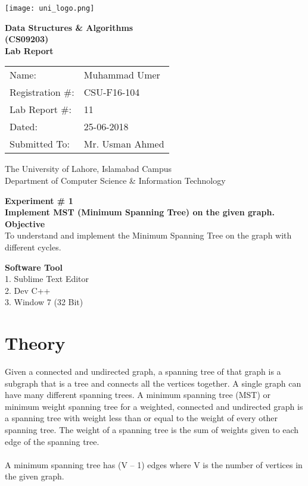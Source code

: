 \documentclass[11pt]{article}            %
\begin{document}
\begin{titlepage}
    \centering
  \vfill
    \texttt{[image: uni\_logo.png]} \\ 
	\vskip2cm
    {\bfseries\Large
	Data Structures  \& Algorithms \\ (CS09203)\\
	
	\vskip2cm
	Lab Report 
	 
	\vskip2cm
	}    

\begin{center}
\begin{tabular}{ l l  } 

Name: & Muhammad Umer \\ 
Registration \#: & CSU-F16-104 \\ 
Lab Report \#: & 11 \\ 
 Dated:& 25-06-2018\\ 
Submitted To:& Mr. Usman Ahmed\\ 

\end{tabular}
\end{center}
    \vfill
    The University of Lahore, Islamabad Campus\\
Department of Computer Science \& Information Technology
\end{titlepage}


    
    {\bfseries\Large
\centering
	Experiment \# 1 \\

Implement MST (Minimum Spanning Tree) on the given graph.\\
	
	}    
 \vskip1cm
 \textbf {Objective}\\  To understand and implement the Minimum Spanning Tree on the graph with different cycles.
 
 \textbf {Software Tool} \\
1. Sublime Text Editor\\
2. Dev C++\\
3. Window 7 (32 Bit)\\

\section{Theory }              
\justify Given a connected and undirected graph, a spanning tree of that graph is a subgraph that is a tree and connects all the vertices together. A single graph can have many different spanning trees. A minimum spanning tree (MST) or minimum weight spanning tree for a weighted, connected and undirected graph is a spanning tree with weight less than or equal to the weight of every other spanning tree. The weight of a spanning tree is the sum of weights given to each edge of the spanning tree.\\~\\ A minimum spanning tree has (V – 1) edges where V is the number of vertices in the given graph.\\~\\
\end{document}
